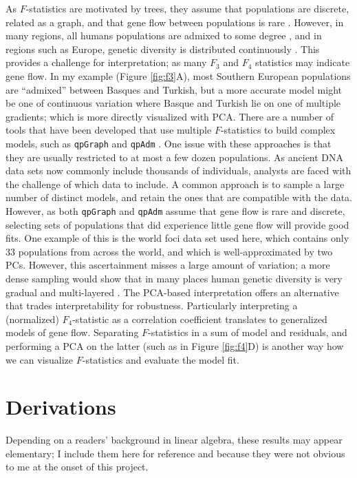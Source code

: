 \documentclass[12pt,fullpage, a4paper]{article}
\begin{document}
As $F$-statistics are motivated by trees, they assume that populations are discrete, related as a graph, and that gene flow between populations is rare \citep{patterson2012,harney2021}. However, in many regions, all humans populations are admixed to some degree \citep{pickrell2014}, and in regions such as Europe, genetic diversity is distributed continuously \citep{novembre2008, novembre2008a}. This provides a challenge for interpretation; as many $F_3$ and $F_4$ statistics may indicate gene flow. In my example (Figure \ref{fig:f3}A), most Southern European populations are ``admixed'' between Basques and Turkish, but a more accurate model might be one of continuous variation where Basque and Turkish lie on one of multiple gradients; which is more directly visualized with PCA. There are a number of tools that have been developed that use multiple $F$-statistics to build complex models, such as \texttt{qpGraph} \citep{lazaridis2014} and \texttt{qpAdm} \citep{harney2021}. One issue with these approaches is that they are usually restricted to at most a few dozen populations. As ancient DNA data sets now commonly include thousands of individuals, analysts are faced with the challenge of which data to include. A common approach is to sample a large number of distinct models, and retain the ones that are compatible with the data. However, as both \texttt{qpGraph} and \texttt{qpAdm} assume that gene flow is rare and discrete, selecting sets of populations that did experience little gene flow will provide good fits. One example of this is the world foci data set used here, which contains only 33 populations from across the world, and which is well-approximated by two PCs. However, this ascertainment misses a large amount of variation; a more dense sampling would show that in many places human genetic diversity is very gradual and multi-layered \citep{lazaridis2014, peter2020a}. The PCA-based  interpretation offers an alternative that trades interpretability for robustness. Particularly interpreting a (normalized) $F_4$-statistic as a correlation coefficient translates to generalized models of gene flow. Separating $F$-statistics in a sum of model and residuals, and performing a PCA on the latter (such as in Figure \ref{fig:f4}D)  is another way how we can visualize $F$-statistics and evaluate the model fit.





\newpage



\newpage
\appendix
\section{Derivations}\label{appendix:fonpc}
\setcounter{equation}{0}
\renewcommand{\theequation}{\thesection\arabic{equation}}
Depending on a readers' background in linear algebra, these results may appear elementary; I include them here for reference and because they were not obvious to me at the onset of this project.
\end{document}
